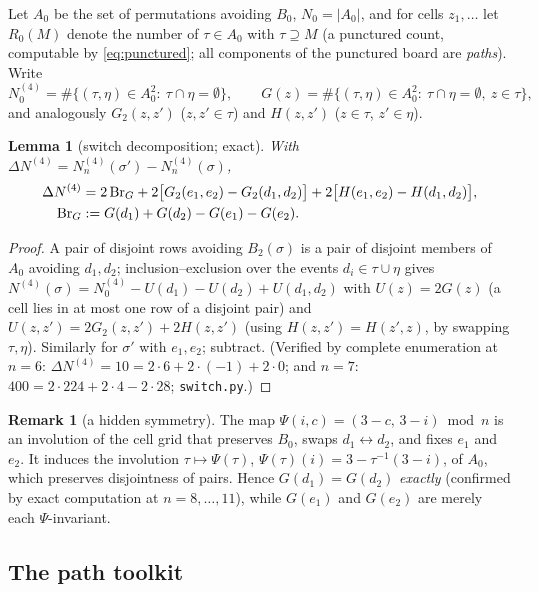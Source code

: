 \documentclass[11pt]{article}
\newtheorem{lemma}[theorem]{Lemma}
\theoremstyle{definition}
\newtheorem{remark}[theorem]{Remark}
\begin{document}
Let $A_0$ be the set of permutations avoiding $B_0$, $N_0=|A_0|$, and for
cells $z_1,\dots$ let $R_0(M)$ denote the number of $\tau\in A_0$ with
$\tau\supseteq M$ (a punctured count, computable by
\eqref{eq:punctured}; all components of the punctured board are
\emph{paths}).  Write
\[
N^{(4)}_0=\#\{(\tau,\eta)\in A_0^2:\ \tau\cap\eta=\emptyset\},\qquad
G(z)=\#\{(\tau,\eta)\in A_0^2:\ \tau\cap\eta=\emptyset,\ z\in\tau\},
\]
and analogously $G_2(z,z')$ ($z,z'\in\tau$) and $H(z,z')$ ($z\in\tau$,
$z'\in\eta$).

\begin{lemma}[switch decomposition; exact]\label{lem:switchIE}
With $\Delta N^{(4)}=N^{(4)}_n(\sigma')-N^{(4)}_n(\sigma)$,
\begin{align}
\Delta N^{(4)}
&=2\,\mathrm{Br}_G
+2\bigl[G_2(e_1,e_2)-G_2(d_1,d_2)\bigr]
+2\bigl[H(e_1,e_2)-H(d_1,d_2)\bigr],
\label{eq:switchIE}\\
\mathrm{Br}_G&:=G(d_1)+G(d_2)-G(e_1)-G(e_2).\notag
\end{align}
\end{lemma}

\begin{proof}
A pair of disjoint rows avoiding $B_2(\sigma)$ is a pair of disjoint
members of $A_0$ avoiding $d_1,d_2$; inclusion--exclusion over the events
$d_i\in\tau\cup\eta$ gives
$N^{(4)}(\sigma)=N^{(4)}_0-U(d_1)-U(d_2)+U(d_1,d_2)$ with
$U(z)=2G(z)$ (a cell lies in at most one row of a disjoint pair) and
$U(z,z')=2G_2(z,z')+2H(z,z')$ (using $H(z,z')=H(z',z)$, by swapping
$\tau,\eta$).  Similarly for $\sigma'$ with $e_1,e_2$; subtract.
(Verified by complete enumeration at $n=6$: $\Delta N^{(4)}=10=
2\cdot6+2\cdot(-1)+2\cdot0$; and $n=7$: $400=2\cdot224+2\cdot4-2\cdot28$;
\texttt{switch.py}.)
\end{proof}

\begin{remark}[a hidden symmetry]\label{rem:psi}
The map $\Psi(i,c)=(3-c,\,3-i)\bmod n$ is an involution of the cell grid
that preserves $B_0$, swaps $d_1\leftrightarrow d_2$, and fixes $e_1$ and
$e_2$.  It induces the involution
$\tau\mapsto\Psi(\tau)$, $\Psi(\tau)(i)=3-\tau^{-1}(3-i)$, of $A_0$,
which preserves disjointness of pairs.  Hence $G(d_1)=G(d_2)$
\emph{exactly} (confirmed by exact computation at $n=8,\dots,11$), while
$G(e_1)$ and $G(e_2)$ are merely each $\Psi$-invariant.
\end{remark}

\subsection{The path toolkit}
\end{document}
